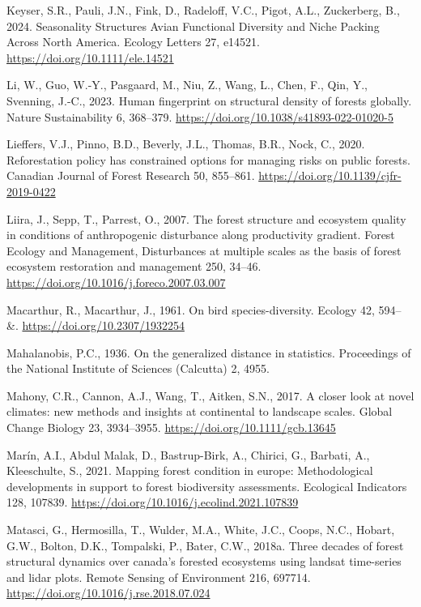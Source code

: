 \documentclass[
]{agujournal2019}
\newlength{\cslhangindent}
\newenvironment{CSLReferences}[2] %
 {\begin{list}{}{%
  \setlength{\itemindent}{0pt}
  \setlength{\leftmargin}{0pt}
  \setlength{\parsep}{0pt}
  \ifodd #1
   \setlength{\leftmargin}{\cslhangindent}
   \setlength{\itemindent}{-1\cslhangindent}
  \fi
  \setlength{\itemsep}{#2\baselineskip}}}
 {\end{list}}
\begin{document}
\begin{CSLReferences}{1}{0}
Keyser, S.R., Pauli, J.N., Fink, D., Radeloff, V.C., Pigot, A.L.,
Zuckerberg, B., 2024. Seasonality Structures Avian Functional Diversity
and Niche Packing Across North America. Ecology Letters 27, e14521.
\url{https://doi.org/10.1111/ele.14521}

Li, W., Guo, W.-Y., Pasgaard, M., Niu, Z., Wang, L., Chen, F., Qin, Y.,
Svenning, J.-C., 2023. Human fingerprint on structural density of
forests globally. Nature Sustainability 6, 368--379.
\url{https://doi.org/10.1038/s41893-022-01020-5}

Lieffers, V.J., Pinno, B.D., Beverly, J.L., Thomas, B.R., Nock, C.,
2020. Reforestation policy has constrained options for managing risks on
public forests. Canadian Journal of Forest Research 50, 855--861.
\url{https://doi.org/10.1139/cjfr-2019-0422}

Liira, J., Sepp, T., Parrest, O., 2007. The forest structure and
ecosystem quality in conditions of anthropogenic disturbance along
productivity gradient. Forest Ecology and Management, Disturbances at
multiple scales as the basis of forest ecosystem restoration and
management 250, 34--46.
\url{https://doi.org/10.1016/j.foreco.2007.03.007}

Macarthur, R., Macarthur, J., 1961. On bird species-diversity. Ecology
42, 594-- \&. \url{https://doi.org/10.2307/1932254}

Mahalanobis, P.C., 1936. On the generalized distance in statistics.
Proceedings of the National Institute of Sciences (Calcutta) 2, 4955.

Mahony, C.R., Cannon, A.J., Wang, T., Aitken, S.N., 2017. A closer look
at novel climates: new methods and insights at continental to landscape
scales. Global Change Biology 23, 3934--3955.
\url{https://doi.org/10.1111/gcb.13645}

Marín, A.I., Abdul Malak, D., Bastrup-Birk, A., Chirici, G., Barbati,
A., Kleeschulte, S., 2021. Mapping forest condition in europe:
Methodological developments in support to forest biodiversity
assessments. Ecological Indicators 128, 107839.
\url{https://doi.org/10.1016/j.ecolind.2021.107839}

Matasci, G., Hermosilla, T., Wulder, M.A., White, J.C., Coops, N.C.,
Hobart, G.W., Bolton, D.K., Tompalski, P., Bater, C.W., 2018a. Three
decades of forest structural dynamics over canada's forested ecosystems
using landsat time-series and lidar plots. Remote Sensing of Environment
216, 697714. \url{https://doi.org/10.1016/j.rse.2018.07.024}


\end{CSLReferences}
\end{document}
